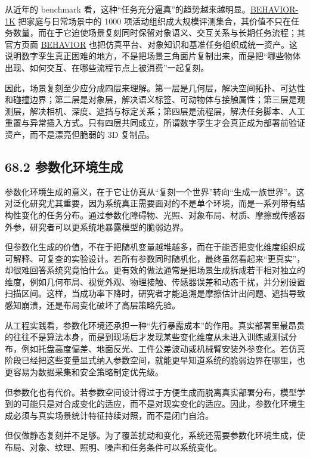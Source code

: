 从近年的 benchmark 看，这种“任务充分逼真”的趋势越来越明显。\href{https://arxiv.org/abs/2403.09227}{BEHAVIOR-1K} 把家庭与日常场景中的 1000 项活动组织成大规模评测集合，其价值不只在任务数量，而在于它迫使场景复刻同时保留对象语义、交互关系与长期任务流程；其官方页面 \href{https://behavior.stanford.edu/}{BEHAVIOR} 也把仿真平台、对象知识和基准任务组织成统一资产。这说明数字孪生真正困难的地方，不是把场景三角面片复制出来，而是把“哪些物体出现、如何交互、在哪些流程节点上被消费”一起复刻。

因此，场景复刻至少应分成四层来理解。第一层是几何层，解决空间拓扑、可达性和碰撞边界；第二层是对象层，解决语义标签、可动物体与接触属性；第三层是观测层，解决相机、深度、遮挡与标定关系；第四层是流程层，解决任务脚本、人工重置与异常插入方式。只有四层共同成立，所谓数字孪生才会真正成为部署前验证资产，而不是漂亮但脆弱的 3D 复制品。

\subsection*{68.2 参数化环境生成}


参数化环境生成的意义，在于它让仿真从“复刻一个世界”转向“生成一族世界”。这对泛化研究尤其重要，因为系统真正需要面对的不是单个环境，而是一系列带有结构性变化的任务分布。通过参数化障碍物、光照、对象布局、材质、摩擦或传感器外参，研究者可以更系统地暴露模型的脆弱边界。

但参数化生成的价值，不在于把随机变量越堆越多，而在于能否把变化维度组织成可解释、可复查的实验设计。若所有参数同时随机化，最终虽然看起来“更真实”，却很难回答系统究竟怕什么。更有效的做法通常是把场景生成拆成若干相对独立的维度，例如几何布局、视觉外观、物理接触、传感器误差和动态干扰，并分别设置扫描区间。这样，当成功率下降时，研究者才能追溯是摩擦估计出问题、遮挡导致感知崩溃，还是布局变化破坏了高层策略先验。

从工程实践看，参数化环境还承担一种“先行暴露成本”的作用。真实部署里最昂贵的往往不是算法本身，而是到现场后才发现某些变化维度从未进入训练或测试分布，例如托盘高度偏差、地面反光、工件公差波动或机械臂安装外参变化。若仿真阶段已经把这些变量显式纳入参数空间，就能更早知道系统的脆弱边界在哪里，也更容易为数据采集和安全策略制定优先级。

但参数化也有代价。若参数空间设计得过于方便生成而脱离真实部署分布，模型学到的可能只是对合成变化的适应，而不是对现实变化的适应。因此，参数化环境生成必须与真实场景统计特征持续对照，而不是闭门自洽。

但仅做静态复刻并不足够。为了覆盖扰动和变化，系统还需要参数化环境生成，使布局、对象、纹理、照明、噪声和任务条件可以系统变化。

